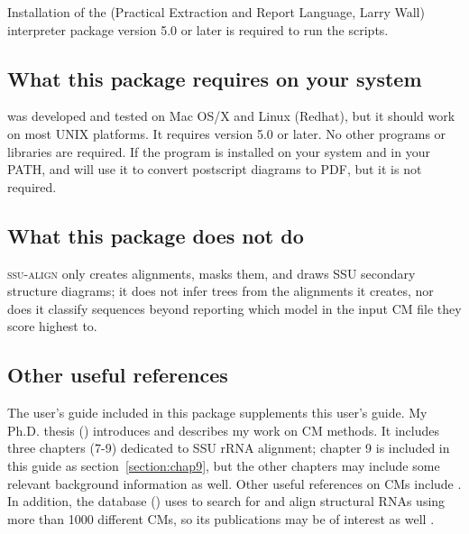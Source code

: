 Installation of the  (Practical Extraction and Report Language,
Larry Wall) interpreter package version 5.0 or later is required to
run the   scripts.

\subsection{What this package requires on your system}

 was developed and tested on Mac OS/X and Linux
(Redhat), but it should work on most UNIX platforms. It requires
 version 5.0 or later. No other programs or libraries
are required. If the program  is installed on
your system and in your PATH,  and  will
use it to convert postscript diagrams to PDF, but it is not required. 

\subsection{What this package does not do}

\textsc{ssu-align} only creates alignments, masks them, and draws SSU
secondary structure diagrams; it does not infer trees from the
alignments it creates, nor does it classify sequences beyond reporting
which model in the input CM file they score highest to.

\subsection{Other useful references}

The  user's guide \cite{infernalguide} included in
this package supplements this user's guide. My Ph.D. thesis 
()
introduces and describes my work on CM methods. It includes three chapters (7-9) dedicated to
SSU rRNA alignment; chapter 9 is included in this guide as
section~\ref{section:chap9}, but the other chapters may include some
relevant background information as well. 
Other useful references on CMs include
\cite{Eddy94,Durbin98,Eddy02b,NawrockiEddy07,Nawrocki09,KolbeEddy09}. In
addition, the  database 
()
uses  to search for and align
structural RNAs using more than 1000 different CMs, so its
publications may be of interest as well
\cite{Griffiths-Jones03,Griffiths-Jones05,Gardner09}.

